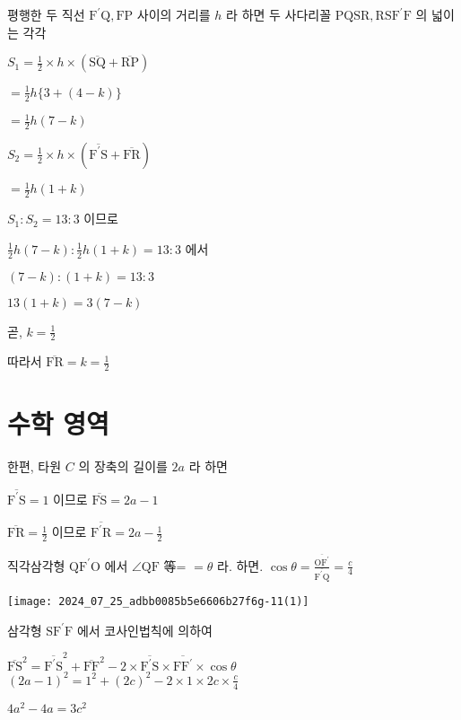 \documentclass[10pt]{article}
\begin{document}
평행한 두 직선 $\mathrm{F}^{\prime} \mathrm{Q}, \mathrm{FP}$ 사이의 거리를 $h$ 라 하면 두 사다리꼴 $\mathrm{PQSR}, \mathrm{RSF}^{\prime} \mathrm{F}$ 의 넓이는 각각

$S_{1}=\frac{1}{2} \times h \times(\overline{\mathrm{SQ}}+\overline{\mathrm{RP}})$

$=\frac{1}{2} h\{3+(4-k)\}$

$=\frac{1}{2} h(7-k)$

$S_{2}=\frac{1}{2} \times h \times\left(\overline{\mathrm{F}^{\prime} \mathrm{S}}+\overline{\mathrm{FR}}\right)$

$=\frac{1}{2} h(1+k)$

$S_{1}: S_{2}=13: 3$ 이므로

$\frac{1}{2} h(7-k): \frac{1}{2} h(1+k)=13: 3$ 에서

$(7-k):(1+k)=13: 3$

$13(1+k)=3(7-k)$

곧, $k=\frac{1}{2}$

따라서 $\overline{\mathrm{FR}}=k=\frac{1}{2}$

\section*{수학 영역}
한편, 타원 $C$ 의 장축의 길이를 $2 a$ 라 하면

$\overline{\mathrm{F}^{\prime} \mathrm{S}}=1$ 이므로 $\overline{\mathrm{FS}}=2 a-1$

$\overline{\mathrm{FR}}=\frac{1}{2}$ 이므로 $\overline{\mathrm{F}^{\prime} \mathrm{R}}=2 a-\frac{1}{2}$

직각삼각형 $\mathrm{QF}^{\prime} \mathrm{O}$ 에서 $\angle \mathrm{QF}$ 等= $=\theta$ 라. 하면. $\cos \theta=\frac{\overline{\mathrm{OF}^{\prime}}}{\overline{\mathrm{F}^{\prime} \mathrm{Q}}}=\frac{c}{4}$

\begin{center}
\texttt{[image: 2024\_07\_25\_adbb0085b5e6606b27f6g-11(1)]}
\end{center}

삼각형 $\mathrm{SF}^{\prime} \mathrm{F}$ 에서 코사인법칙에 의하여

$\overline{\mathrm{FS}}^{2}={\overline{\mathrm{F}^{\prime} \mathrm{S}}}^{2}+\overline{\mathrm{FF}}^{2}-2 \times \overline{\mathrm{F}^{\prime} \mathrm{S}} \times \overline{\mathrm{FF}^{\prime}} \times \cos \theta$ $(2 a-1)^{2}=1^{2}+(2 c)^{2}-2 \times 1 \times 2 c \times \frac{c}{4}$

$4 a^{2}-4 a=3 c^{2}$
\end{document}
